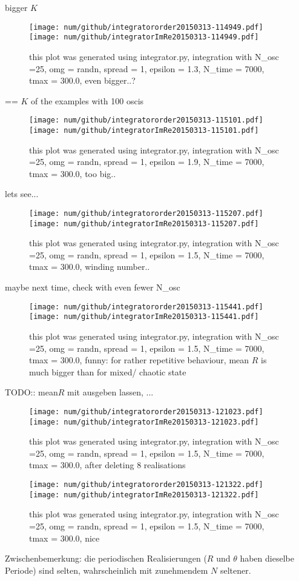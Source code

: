 bigger $K$
\begin{figure}[h!]\centering\texttt{[image: num/github/integratororder20150313-114949.pdf]}\texttt{[image: num/github/integratorImRe20150313-114949.pdf]}\caption{this plot was generated using integrator.py, integration with N\_osc =25, omg = randn, spread = 1, epsilon = 1.3, N\_time = 7000, tmax = 300.0, even bigger..?}\end{figure}
== $K$ of the examples with 100 oscis
\begin{figure}[h!]\centering\texttt{[image: num/github/integratororder20150313-115101.pdf]}\texttt{[image: num/github/integratorImRe20150313-115101.pdf]}\caption{this plot was generated using integrator.py, integration with N\_osc =25, omg = randn, spread = 1, epsilon = 1.9, N\_time = 7000, tmax = 300.0, too big..}\end{figure}
lets see...
\begin{figure}[h!]\centering\texttt{[image: num/github/integratororder20150313-115207.pdf]}\texttt{[image: num/github/integratorImRe20150313-115207.pdf]}\caption{this plot was generated using integrator.py, integration with N\_osc =25, omg = randn, spread = 1, epsilon = 1.5, N\_time = 7000, tmax = 300.0, winding number..}\end{figure}

maybe next time, check with even fewer N\_osc
\begin{figure}[h!]\centering\texttt{[image: num/github/integratororder20150313-115441.pdf]}\texttt{[image: num/github/integratorImRe20150313-115441.pdf]}\caption{this plot was generated using integrator.py, integration with N\_osc =25, omg = randn, spread = 1, epsilon = 1.5, N\_time = 7000, tmax = 300.0, funny: for rather repetitive behaviour, mean $R$ is much bigger than for mixed/ chaotic state}\end{figure}


\color{red}TODO:\color{black}: mean$R$ mit ausgeben lassen, ...\\ 

\begin{figure}[h!]\centering\texttt{[image: num/github/integratororder20150313-121023.pdf]}\texttt{[image: num/github/integratorImRe20150313-121023.pdf]}\caption{this plot was generated using integrator.py, integration with N\_osc =25, omg = randn, spread = 1, epsilon = 1.5, N\_time = 7000, tmax = 300.0, after deleting 8 realisations}\end{figure}
\begin{figure}[h!]\centering\texttt{[image: num/github/integratororder20150313-121322.pdf]}\texttt{[image: num/github/integratorImRe20150313-121322.pdf]}\caption{this plot was generated using integrator.py, integration with N\_osc =25, omg = randn, spread = 1, epsilon = 1.5, N\_time = 7000, tmax = 300.0, nice}\end{figure}
Zwischenbemerkung: die periodischen Realisierungen ($R$ und $\theta$ haben dieselbe Periode) sind selten, wahrscheinlich mit zunehmendem $N$ seltener. 

